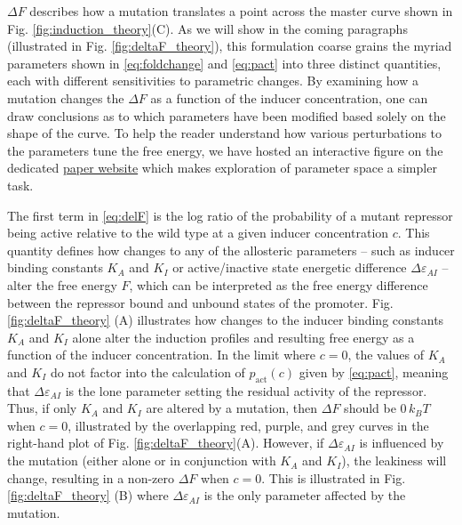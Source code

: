 $\Delta F$ describes how a mutation translates a point across the master
curve shown in Fig. \ref{fig:induction_theory}(C). As we will show in the
coming paragraphs (illustrated in Fig.
\ref{fig:deltaF_theory}), this formulation coarse grains the myriad
parameters shown in \eqref{eq:foldchange} and \eqref{eq:pact} into three
distinct quantities, each with different sensitivities to parametric changes. By
examining how a mutation changes the $\Delta F$ as a function of the inducer
concentration, one can draw conclusions as to which parameters have been
modified based solely on the shape of the curve.
To help the reader understand how various perturbations to the parameters
tune the free energy, we have hosted an interactive figure on the dedicated  
\href{http://www.rpgroup.caltech.edu/mwc_mutants}{paper website} which makes
exploration of parameter space a simpler task.


The first term in \eqref{eq:delF} is the log ratio of the probability of a
mutant repressor being active relative to the wild type at a given inducer concentration $c$. This quantity defines how
changes to any of the allosteric parameters -- such as inducer binding
constants $K_A$ and $K_I$ or active/inactive state energetic difference
$\Delta\varepsilon_{AI}$ -- alter the free energy $F$, which can be interpreted
as the free energy difference between the
repressor bound and unbound states of the promoter. Fig.
\ref{fig:deltaF_theory} (A) illustrates how changes to the inducer binding
constants $K_A$ and $K_I$ alone alter the induction profiles and resulting
free energy as a function of the inducer concentration. In the limit where $c
= 0$, the values of $K_A$ and $K_I$ do not factor into the calculation of
$p_\text{act}(c)$ given by \eqref{eq:pact}, meaning that
$\Delta\varepsilon_{AI}$ is the lone parameter setting the residual activity
of the repressor. Thus, if only $K_A$ and $K_I$ are altered by a mutation,
then $\Delta F$ should be $0\, k_BT$ when $c = 0$, illustrated by the overlapping
red, purple, and grey curves in the right-hand plot of Fig.
\ref{fig:deltaF_theory}(A). However, if $\Delta\varepsilon_{AI}$ is
influenced by the mutation (either alone or in conjunction with $K_A$ and
$K_I$), the leakiness will change, resulting in a non-zero $\Delta F$ when
$c=0$. This is illustrated in Fig. \ref{fig:deltaF_theory} (B) where
$\Delta\varepsilon_{AI}$ is the only parameter affected by the
mutation. 

